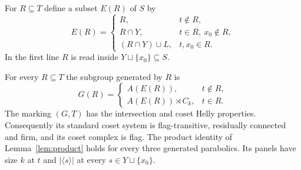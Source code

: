 For $R\subseteq T$ define a subset $E(R)$ of $S$ by
\[
 E(R)=\begin{cases}
 R,&t\notin R,\\
 R\cap Y,&t\in R,\ x_0\notin R,\\
 (R\cap Y)\cup L,&t,x_0\in R.
 \end{cases}
\]
In the first line $R$ is read inside $Y\sqcup\{x_0\}\subseteq S$.
\begin{theorem}\label{thm:cyclic}
For every $R\subseteq T$ the subgroup generated by $R$ is
\begin{equation}\label{eq:all-subgroups}
 G(R)=\begin{cases}
 A(E(R)),&t\notin R,\\
 A(E(R))\rtimes C_k,&t\in R.
 \end{cases}
\end{equation}
The marking $(G,T)$ has the intersection and coset Helly properties.
Consequently its standard coset system is flag-transitive, residually
connected and firm, and its coset complex is flag. The product identity
of Lemma~\ref{lem:product} holds for every three generated parabolics.
Its panels have size $k$ at $t$ and $|\langle s\rangle|$ at every
$s\in Y\sqcup\{x_0\}$.
\end{theorem}
